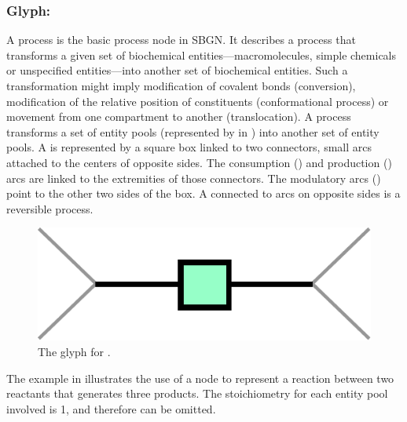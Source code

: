 
\subsubsection{Glyph: }
\label{sec:process}

A process is the basic process node in SBGN.  It describes a process that transforms a given set of biochemical entities---macromolecules, simple chemicals or unspecified entities---into another set of biochemical entities.  Such a transformation might imply modification of covalent bonds (conversion), modification of the relative position of constituents (conformational process) or movement from one compartment to another (translocation). A process transforms a set of entity pools (represented by  in \SBGNPDLone) into another set of entity pools. A  is represented by a square box linked to two connectors, small arcs attached to the centers of opposite sides. The consumption () and production () arcs are linked to the extremities of those connectors. The modulatory arcs () point to the other two sides of the box. A  connected to  arcs on opposite sides is a reversible process. 

\begin{figure}[htb]
  \centering
  \includegraphics[scale = 0.4]{le_images/process}
  \caption{The \PD glyph for .}
  \label{fig:process}
\end{figure}

The example in  illustrates the use of a  node to represent a reaction between two reactants that generates three products. The stoichiometry for each entity pool involved is 1, and therefore can be omitted.  

